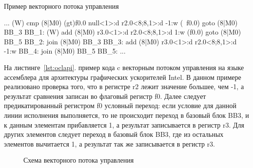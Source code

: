 \begin{ListingEnv}[!h]
    \captiondelim{ } 
    \caption{Пример векторного потока управления}\label{lst:simdcf}
    \begin{Verb}
  ...
  (W)     cmp  (8|M0)  (gt)f0.0  null<1>:d  r2.0<8;8,1>:d -1:w
  (~f0.0) goto (8|M0)            BB_3
  BB_1:
  (W)     add  (8|M0)            r3.0<1>:d  r2.0<8;8,1>:d  1:w
  (f0.0)  goto (8|M0)            BB_5
  BB_2:
          join (8|M0)            BB_3
  BB_3:
          add  (8|M0)            r3.0<1>:d  r2.0<8;8,1>:d -1:w
  BB_4:
          join (8|M0)            BB_5
  BB_5:
  ...
    \end{Verb}
\end{ListingEnv}

На листинге~\cref{lst:oclapi}. пример кода c векторным потоком управления на языке ассемблера для архитектуры графических ускорителей Intel. В данном примере реализовано проверка того, что в регистре r2 лежит значение большее, чем -1, а результат сравнения записан во флаговый регистр f0. Далее следует предикатированный регистром f0 условный переход: если условие для данной линии исполнения выполняется, то не происходит переход в базовый блок BB3, и к данным элементам прибавляется 1, а результат записывается в регистр r3. Для других элементов следует переход в базовый блок BB3, где из остальных элементов вычитается 1, а результат так же записывается в регистр r3.

\begin{figure}[ht]
    \caption{Схема векторного потока управления}\label{fig:HW-goto-example}
\end{figure}

